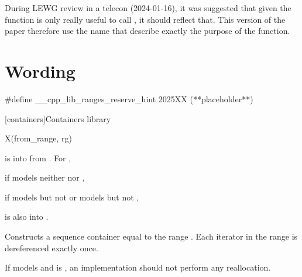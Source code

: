 \documentclass{wg21}
\begin{document}
During LEWG review in a telecon (2024-01-16), it was suggested that given the function is only really useful to call , it should reflect that.
This version of the paper therefore use the name  that describe exactly the purpose of the function.


\section{Wording}

\begin{addedblock}
\begin{codeblock}
    #define __cpp_lib_ranges_reserve_hint 2025XX (**placeholder**)
\end{codeblock}
\end{addedblock}

[containers]{Containers library}

\begin{itemdecl}
X(from_range, rg)
\end{itemdecl}

\begin{itemdescr}
\pnum
\expects
{} is  into 
from .
For ,
\begin{removedblock}
if  models neither  nor ,
\end{removedblock}

\begin{addedblock}
if  models  but not  or models   but not ,
\end{addedblock}
 is also  into .

\pnum
\effects
Constructs a sequence container equal to the range .
Each iterator in the range  is dereferenced exactly once.

\begin{addedblock}
\recommended If  models 
and  is , an implementation
should not perform any reallocation.
\end{addedblock}
\end{itemdescr}
\end{document}
